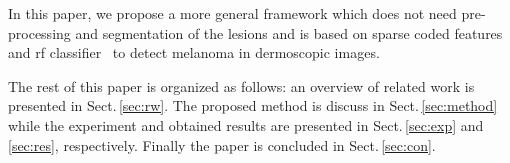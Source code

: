 In this paper, we propose a more general framework which does not need pre-processing and segmentation of the lesions and is based on sparse coded features and \ac{rf} classifier~\cite{breiman2001random} to detect melanoma in dermoscopic images.

The rest of this paper is organized as follows: an overview of related work is presented in Sect.\,\ref{sec:rw}.
The proposed method is discuss in Sect.\,\ref{sec:method} while the experiment and obtained results are presented in Sect.\,\ref{sec:exp} and\,\ref{sec:res}, respectively.
Finally the paper is concluded in Sect.\,\ref{sec:con}.

%
%
